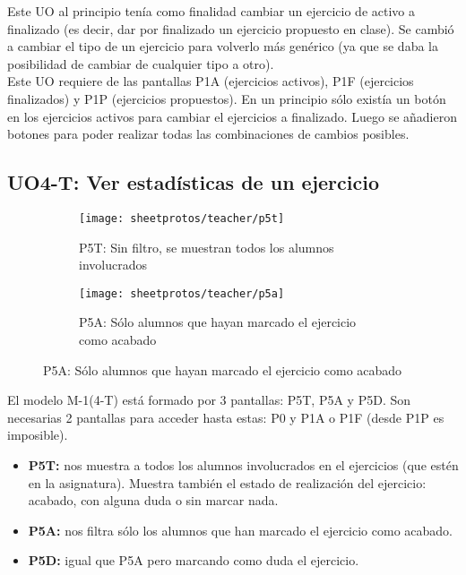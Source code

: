 Este UO al principio tenía como finalidad cambiar un ejercicio de activo a finalizado (es decir, dar por finalizado un ejercicio propuesto en clase). Se cambió a cambiar el tipo de un ejercicio para volverlo más genérico (ya que se daba la posibilidad de cambiar de cualquier tipo a otro).\\

Este UO requiere de las pantallas P1A (ejercicios activos), P1F (ejercicios finalizados) y P1P (ejercicios propuestos). En un principio sólo existía un botón en los ejercicios activos para cambiar el ejercicios a finalizado. Luego se añadieron botones para poder realizar todas las combinaciones de cambios posibles.\\

\subsection{UO4-T: Ver estadísticas de un ejercicio}
\label{analisis-de-requisitos:funcionales:uo4t}

\begin{figure}[H]
\begin{subfigure}[b]{0.5\textwidth}
	\texttt{[image: sheetprotos/teacher/p5t]}
	\caption{P5T: Sin filtro, se muestran todos los alumnos involucrados}
	\label{fig:p5t}
\end{subfigure}
%
\begin{subfigure}[b]{0.5\textwidth}
	\texttt{[image: sheetprotos/teacher/p5a]}
	\caption{P5A: Sólo alumnos que hayan marcado el ejercicio como acabado}
	\label{fig:p5a}
\end{subfigure}

\label{fig:p5}
\end{figure}

El modelo M-1(4-T) está formado por 3 pantallas: P5T, P5A y P5D. Son necesarias 2 pantallas para acceder hasta estas: P0 y P1A o P1F (desde P1P es imposible).\\

\begin{itemize}
\item \textbf{P5T:} nos muestra a todos los alumnos involucrados en el ejercicios (que estén en la asignatura). Muestra también el estado de realización del ejercicio: acabado, con alguna duda o sin marcar nada.
\item \textbf{P5A:} nos filtra sólo los alumnos que han marcado el ejercicio como acabado.
\item \textbf{P5D:} igual que P5A pero marcando como duda el ejercicio.
\end{itemize}

